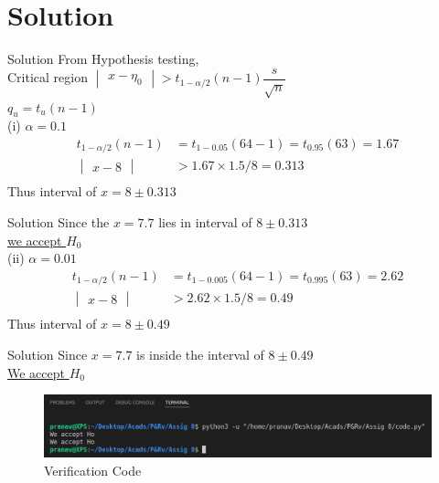 \documentclass{beamer}
\newcommand{\mydet}[1]{\ensuremath{\begin{vmatrix}#1\end{vmatrix}}}
\begin{document}
    \section{Solution}
        \begin{frame}{Solution}
        From Hypothesis testing,\\
        Critical region $\mydet{x - {\eta}_0} > {t}_{1 - \alpha /2 } (n-1) \dfrac{s}{\sqrt{n}}$ \\[9pt]
        $q_u = t_u(n-1)$\\[9pt]
        (i) \underline{$\alpha = 0.1$}
        \begin{align*}
        t_{1 - \alpha /2} (n-1) &= t_{1 - 0.05} (64 - 1) = t_{0.95} (63) = 1.67\\[9pt]
        \mydet{x-8} &> 1.67 \times 1.5/8 =0.313\\
        \end{align*}
        Thus interval of $x = 8 \pm 0.313$ \\
        \end{frame}
    \begin{frame}{Solution}
    Since the $ x = 7.7 $ lies in interval of $8 \pm 0.313$ \\[7pt]
    \underline{we accept $H_0$}\\[9pt]
    (ii) \underline{$\alpha = 0.01$}
    \begin{align*}
     t_{1 - \alpha /2} (n-1) &= t_{1 - 0.005} (64 - 1) = t_{0.995} (63) = 2.62\\[9pt]
     \mydet{x-8} &> 2.62 \times 1.5/8 =0.49\\
    \end{align*}
    Thus interval of $x = 8 \pm 0.49$ \\
    \end{frame}
    \begin{frame}{Solution}
    Since $x = 7.7$ is inside the interval of $8 \pm 0.49$\\[7pt]
    \underline{We accept $H_0$}
    \begin{figure}[H]
		\centering
			\includegraphics[width=\columnwidth]{figs/output.png}
			\caption{Verification Code}
			\label{Fig1}	
	\end{figure}
    \end{frame}
    
    
\end{document}
